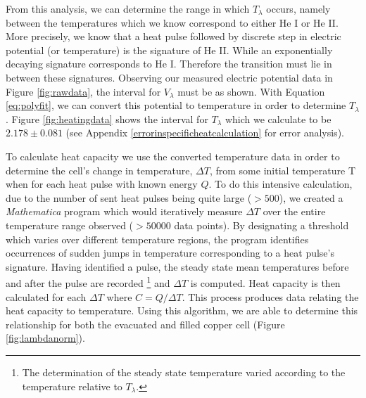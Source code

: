 From this analysis, we can determine the range in which $T_{\lambda}$ occurs, namely between the temperatures which we know correspond to either He I or He II.  More precisely, we know that a heat pulse followed by discrete step in electric potential (or temperature) is the signature of He II.  While an exponentially decaying signature corresponds to He I. Therefore the transition must lie in between these signatures.  Observing our measured electric potential data in Figure \ref{fig:rawdata}, the interval for $V_{\lambda}$ must be as shown.  With Equation \ref{eq:polyfit}, we can convert this potential to temperature in order to determine $T_{\lambda}$.  Figure \ref{fig:heatingdata} shows the interval for $T_{\lambda}$ which we calculate to be $2.178\pm0.081$ (see Appendix \ref{errorinspecificheatcalculation} for error analysis). 

To calculate heat capacity we use the converted temperature data in order to determine the cell's change in temperature, $\Delta T$, from some initial temperature T when for each heat pulse with known energy $Q$.  To do this intensive calculation, due to the number of sent heat pulses being quite large ($>500$), we created a \emph{Mathematica} program which would iteratively measure $\Delta T$ over the entire temperature range observed ($>50000$ data points).  By designating a threshold which varies over different temperature regions, the program identifies occurrences of sudden jumps in temperature corresponding to a heat pulse's signature. Having identified a pulse, the steady state mean temperatures before and after the pulse are recorded \footnote{The determination of the steady state temperature varied according to the temperature relative to $T_{\lambda}$.} and $\Delta T$ is computed.  Heat capacity is then calculated for each $\Delta T$ where $C=Q/\Delta T$.  This process produces data relating the heat capacity to temperature.  Using this algorithm, we are able to determine this relationship for both the evacuated and filled copper cell (Figure \ref{fig:lambdanorm}).


